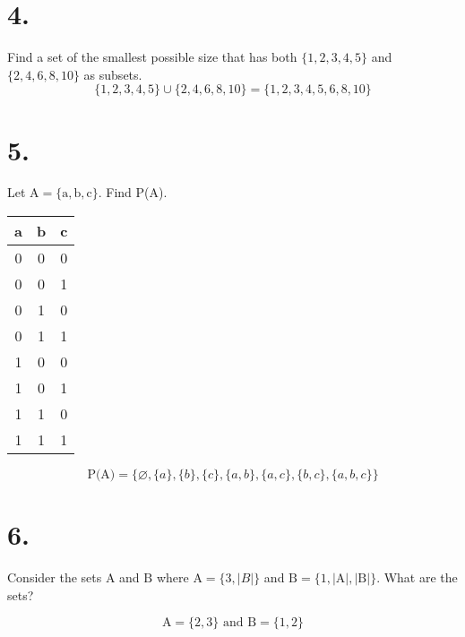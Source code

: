 \documentclass[11pt, letterpaper, includehead]{article}
\begin{document}
\section*{4.} Find a set of the smallest possible size that has both $\{1, 2, 3, 4, 5\}$ and $\{2, 4, 6, 8, 10\}$ as subsets.
\[\{1, 2, 3, 4, 5\} \cup \{2, 4, 6, 8, 10\} = \{1, 2, 3, 4, 5, 6, 8, 10\}\]


\section*{5.} Let $\text{A} = \{\text{a}, \text{b}, \text{c}\}$. Find P(A).
    
\begin{table}[H]
    \centering
    \begin{tabular}{ccc}
    a & b & c \\ \hline
    0 & 0 & 0 \\
    0 & 0 & 1 \\
    0 & 1 & 0 \\
    0 & 1 & 1 \\
    1 & 0 & 0 \\
    1 & 0 & 1 \\
    1 & 1 & 0 \\
    1 & 1 & 1
    \end{tabular}
\end{table}


\[\text{P(A)}= \{ \varnothing, \{a\}, \{b\}, \{c\}, \{a, b\}, \{a, c\}, \{b, c\}, \{a, b, c\}\} \]

\section*{6.} Consider the sets $\text{A}$ and $\text{B}$ where $\text{A} = \{3, |B|\}$ and $\text{B} = \{ 1, |\text{A}|, |\text{B}|\}$. What are the sets?

\[\text{A} = \{2, 3\} \text{ and } \text{B} = \{1, 2\} \]
\end{document}
